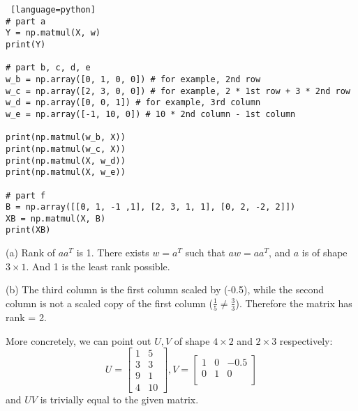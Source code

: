 \documentclass[a4paper, 12pt]{article}
\begin{document}
\begin{solution}
\begin{lstlisting} [language=python]
# part a
Y = np.matmul(X, w)
print(Y)

# part b, c, d, e
w_b = np.array([0, 1, 0, 0]) # for example, 2nd row
w_c = np.array([2, 3, 0, 0]) # for example, 2 * 1st row + 3 * 2nd row
w_d = np.array([0, 0, 1]) # for example, 3rd column
w_e = np.array([-1, 10, 0]) # 10 * 2nd column - 1st column

print(np.matmul(w_b, X))
print(np.matmul(w_c, X))
print(np.matmul(X, w_d))
print(np.matmul(X, w_e))

# part f
B = np.array([[0, 1, -1 ,1], [2, 3, 1, 1], [0, 2, -2, 2]])
XB = np.matmul(X, B)
print(XB)
    \end{lstlisting}
\end{solution}

\begin{problem}
\end{problem}
\begin{solution}
    (a) Rank of $aa^T$ is 1. There exists $w = a^T$ such that $aw = aa^T$, and $a$ is of shape $3 \times 1$. And 1 is the least rank possible.

    (b) The third column is the first column scaled by (-0.5), while the second column is not a scaled copy of the first column ($\frac{1}{5} \neq \frac{3}{3}$). Therefore the matrix has rank = 2.

    More concretely, we can point out $U, V$ of shape $4 \times 2$ and $2 \times 3$ respectively:
    \[
        U = \begin{bmatrix}
            1 & 5  \\
            3 & 3  \\
            9 & 1  \\
            4 & 10
        \end{bmatrix}, V = \begin{bmatrix}
            1 & 0 & -0.5 \\
            0 & 1 & 0    \\
        \end{bmatrix}
    \]
    and $UV$ is trivially equal to the given matrix.
\end{solution}
\end{document}
